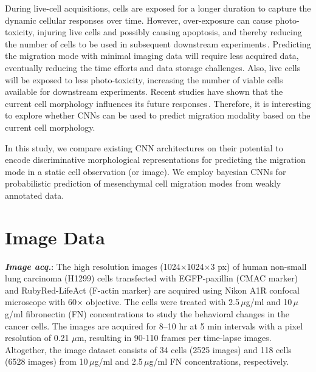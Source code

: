 \documentclass{article}
\begin{document}
During live-cell acquisitions, cells are exposed for a longer duration to
capture the dynamic cellular responses over time. However, over-exposure can cause photo-toxicity,
injuring live cells and possibly causing apoptosis, and thereby reducing the number of cells to be
used in subsequent downstream experiments\,\cite{shafqat2016analysis}. Predicting the migration mode with 
minimal imaging data will require less acquired data, eventually reducing the time efforts and data
storage challenges. Also, live cells will be exposed to less photo-toxicity, increasing the number
of viable cells available for downstream experiments. Recent studies have shown that the current
cell morphology influences its future responses\,\cite{nishimoto2019predicting}. %
Therefore, it is interesting to explore whether CNNs can be used to predict migration modality based
on the current cell morphology.

In this study, we compare existing CNN architectures on their potential to encode discriminative
morphological representations for predicting the migration mode in a static cell observation (or image). We 
employ bayesian CNNs for probabilistic prediction of mesenchymal cell migration modes from weakly 
annotated data. 

\section{Image Data}
\label{sec:data}
\textit{\textbf{Image acq.}}:
The high resolution images (1024$\times$1024$\times$3 px) of human non-small lung carcinoma (H1299) cells
transfected with EGFP-paxillin (CMAC marker) and RubyRed-LifeAct (F-actin marker) are acquired using 
Nikon A1R confocal microscope with 60$\times$ objective. The cells were treated with 
2.5\,$\mu$g/ml and 10\,$\mu$g/ml fibronectin (FN) concentrations to study the behavioral changes in the 
cancer cells.
The images are acquired for 8–10 hr at 5 min intervals with a pixel resolution of 0.21 $\mu$m, resulting 
in 90-110 frames per time-lapse images.
Altogether, the image dataset consists of 34 cells (2525 images) and 118 cells (6528 images) from 
10\,$\mu$g/ml and 2.5\,$\mu$g/ml FN concentrations, respectively. 
\end{document}
